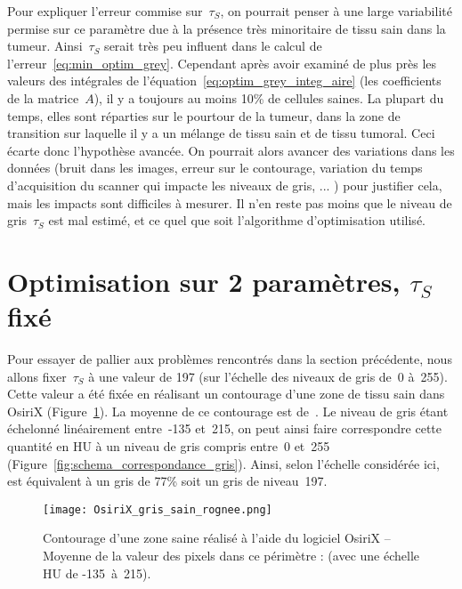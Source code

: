 \documentclass[main.tex]{subfiles}
\begin{document}
Pour expliquer l'erreur commise sur~$\tau_S$, on pourrait penser à une large variabilité permise sur ce paramètre due à la présence très minoritaire de tissu  sain dans la tumeur. Ainsi~$\tau_S$ serait très peu influent dans le calcul de l'erreur~\eqref{eq:min_optim_grey}. Cependant après avoir examiné de plus près les valeurs des intégrales de l'équation~\eqref{eq:optim_grey_integ_aire} (\ie les coefficients de la matrice~$A$), il y a toujours au moins 10\% de cellules saines. La plupart du temps, elles sont réparties sur le pourtour de la tumeur, dans la zone de transition sur laquelle il y a un mélange de tissu sain et de tissu tumoral. Ceci écarte donc l'hypothèse avancée. On pourrait alors avancer des variations dans les données (bruit dans les images, erreur sur le contourage, variation du temps d'acquisition du scanner qui impacte les niveaux de gris, ... ) pour justifier cela, mais les impacts sont difficiles à mesurer. 
Il n'en reste pas moins que le niveau de gris~$\tau_S$ est mal estimé, et ce quel que soit l'algorithme d'optimisation utilisé. 


\section{Optimisation sur 2 paramètres, $\tau_S$ fixé \label{sec:optim_2_param}}
Pour essayer de pallier aux problèmes rencontrés dans la section précédente, nous allons fixer~$\tau_S$ à une valeur de 197 (sur l'échelle des niveaux de gris de~0 à~255). Cette valeur a été fixée en réalisant un contourage d'une zone de tissu sain dans OsiriX (\cf  Figure~\ref{fig:contourage_sain}). La moyenne de ce contourage est de~. Le niveau de gris étant échelonné linéairement entre~-135 et~215, on peut ainsi faire correspondre cette quantité en HU à un niveau de gris compris entre~0 et~255 (\cf Figure~\ref{fig:schema_correspondance_gris}). Ainsi, selon l'échelle considérée ici,  est  équivalent à un gris de 77\% soit un gris de niveau~197.


\begin{figure}
\texttt{[image: OsiriX\_gris\_sain\_rognee.png]}
\caption{\label{fig:contourage_sain}Contourage d'une zone saine réalisé à l'aide du logiciel OsiriX -- Moyenne de la valeur des pixels dans ce périmètre :  (avec une échelle HU de \mbox{-135 à 215}).}
\end{figure}
\end{document}
